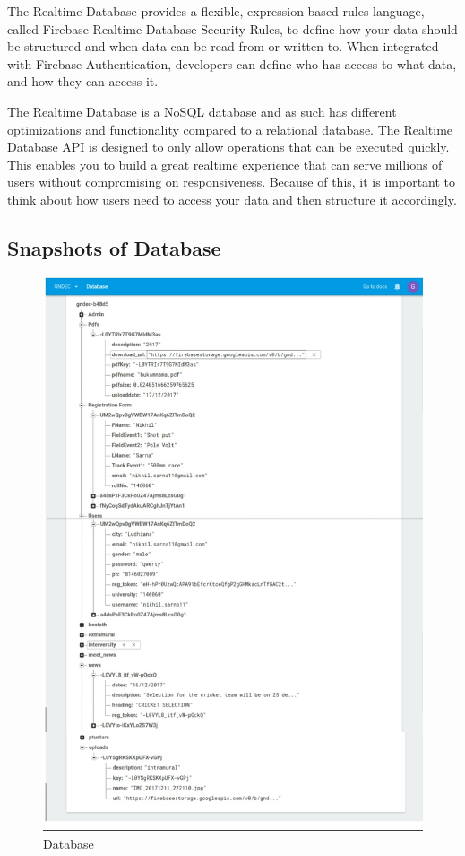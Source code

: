 The Realtime Database provides a flexible, expression-based rules language, called Firebase Realtime Database Security Rules, to define how your data should be structured and when data can be read from or written to. When integrated with Firebase Authentication, developers can define who has access to what data, and how they can access it.

The Realtime Database is a NoSQL database and as such has different optimizations and functionality compared to a relational database. The Realtime Database API is designed to only allow operations that can be executed quickly. This enables you to build a great realtime experience that can serve millions of users without compromising on responsiveness. Because of this, it is important to think about how users need to access your data and then structure it accordingly.


\newpage
\subsection{Snapshots of Database}
\begin{figure}[ht]
		\centering
		\includegraphics[scale=0.30]{images/dbfire.jpg}
		\caption{Database}
	\end{figure}



